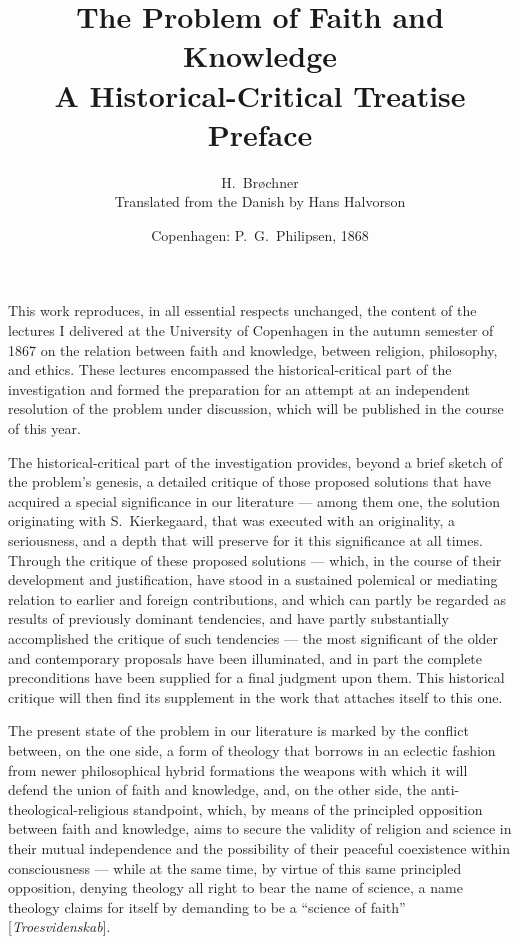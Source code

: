 \documentclass[12pt,a4paper]{article}
\title{\textbf{The Problem of Faith and Knowledge}\\[6pt]
  \large A Historical-Critical Treatise\\[10pt]
  \normalsize Preface}
\author{H.\ Brøchner\\[4pt]
  \small Translated from the Danish by Hans Halvorson}
\date{Copenhagen: P.\ G.\ Philipsen, 1868}
\begin{document}
\maketitle
\thispagestyle{fancy}

\bigskip

\noindent This work reproduces, in all essential respects unchanged,
the content of the lectures I delivered at the University of Copenhagen
in the autumn semester of 1867 on the relation between faith and
knowledge, between religion, philosophy, and ethics. These lectures
encompassed the historical-critical part of the investigation and
formed the preparation for an attempt at an independent resolution of
the problem under discussion, which will be published in the course of
this year.

The historical-critical part of the investigation provides, beyond a
brief sketch of the problem's genesis, a detailed critique of those
proposed solutions that have acquired a special significance in our
literature --- among them one, the solution originating with
S.\ Kierkegaard, that was executed with an originality, a seriousness,
and a depth that will preserve for it this significance at all times.
Through the critique of these proposed solutions --- which, in the
course of their development and justification, have stood in a
sustained polemical or mediating relation to earlier and foreign
contributions, and which can partly be regarded as results of
previously dominant tendencies, and have partly substantially
accomplished the critique of such tendencies --- the most significant
of the older and contemporary proposals have been illuminated, and in
part the complete preconditions have been supplied for a final judgment
upon them. This historical critique will then find its supplement in
the work that attaches itself to this one.

The present state of the problem in our literature is marked by the
conflict between, on the one side, a form of theology that borrows in
an eclectic fashion from newer philosophical hybrid formations the
weapons with which it will defend the union of faith and knowledge,
and, on the other side, the anti-theological-religious standpoint,
which, by means of the principled opposition between faith and
knowledge, aims to secure the validity of religion and science in
their mutual independence and the possibility of their peaceful
coexistence within consciousness --- while at the same time, by virtue
of this same principled opposition, denying theology all right to bear
the name of science, a name theology claims for itself by demanding to
be a ``science of faith'' [\textit{Troesvidenskab}].
\end{document}
